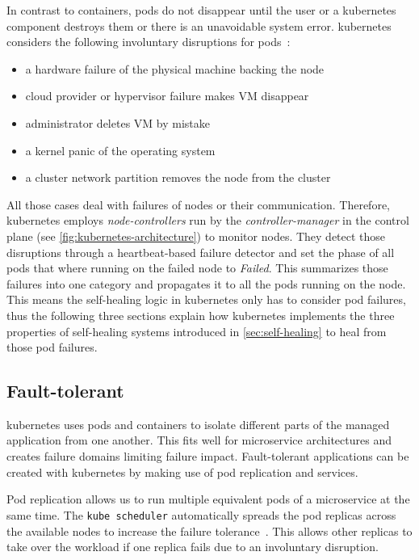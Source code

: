   In contrast to containers, pods do not disappear until the user or a \gls{kubernetes} component destroys them or there is an unavoidable system error.
  \Gls{kubernetes} considers the following involuntary disruptions for pods~\cite{kubernetesdoc}:

  \begin{itemize}
    \item a hardware failure of the physical machine backing the node
    \item cloud provider or hypervisor failure makes VM disappear
    \item administrator deletes VM by mistake
    \item a kernel panic of the operating system
    \item a cluster network partition removes the node from the cluster
  \end{itemize}

  All those cases deal with failures of nodes or their communication.
  Therefore, \gls{kubernetes} employs \textit{node-controllers} run by the \textit{controller-manager} in the control plane (see \cref{fig:kubernetes-architecture}) to monitor nodes.
  They detect those disruptions through a heartbeat-based failure detector and set the phase of all pods that where running on the failed node to \textit{Failed}.
  This summarizes those failures into one category and propagates it to all the pods running on the node.
  This means the self-healing logic in \gls{kubernetes} only has to consider pod failures,
  thus the following three sections explain how \gls{kubernetes} implements the three properties of self-healing systems introduced in \cref{sec:self-healing} to heal from those pod failures.

\subsection{Fault-tolerant}\label{sec:self-healing-kubernetes:fault-tolerant}
  \Gls{kubernetes} uses pods and containers to isolate different parts of the managed application from one another.
  This fits well for microservice architectures and creates failure domains limiting failure impact.
  Fault-tolerant applications can be created with \gls{kubernetes} by making use of pod replication and \glspl{service}.

  Pod replication allows us to run multiple equivalent pods of a microservice at the same time.
  The \texttt{kube scheduler} automatically spreads the pod replicas across the available nodes to increase the failure tolerance~\cite{kubernetesdoc}.
  This allows other replicas to take over the workload if one replica fails due to an involuntary disruption.

